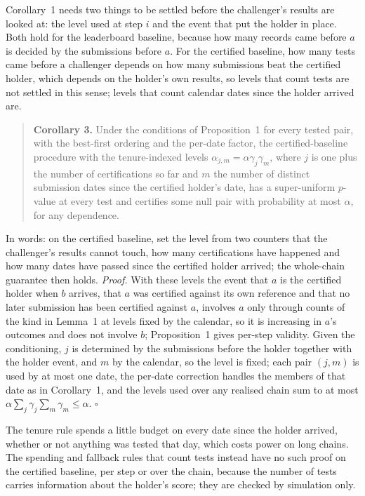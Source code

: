 \documentclass[11pt]{article}
\begin{document}
Corollary~1 needs two things to be settled before the challenger's results are looked at: the level used at step $i$ and the event that put the holder in place.
Both hold for the leaderboard baseline, because how many records came before $a$ is decided by the submissions before $a$.
For the certified baseline, how many tests came before a challenger depends on how many submissions beat the certified holder, which depends on the holder's own results, so levels that count tests are not settled in this sense; levels that count calendar dates since the holder arrived are.

\begin{quote}
\textbf{Corollary 3.}
Under the conditions of Proposition~1 for every tested pair, with the best-first ordering and the per-date factor, the certified-baseline procedure with the tenure-indexed levels $\alpha_{j,m}=\alpha\gamma_j\gamma_m$, where $j$ is one plus the number of certifications so far and $m$ the number of distinct submission dates since the certified holder's date, has a super-uniform $p$-value at every test and certifies some null pair with probability at most $\alpha$, for any dependence.
\end{quote}
In words: on the certified baseline, set the level from two counters that the challenger's results cannot touch, how many certifications have happened and how many dates have passed since the certified holder arrived; the whole-chain guarantee then holds.
\emph{Proof.}
With these levels the event that $a$ is the certified holder when $b$ arrives, that $a$ was certified against its own reference and that no later submission has been certified against $a$, involves $a$ only through counts of the kind in Lemma~1 at levels fixed by the calendar, so it is increasing in $a$'s outcomes and does not involve $b$; Proposition~1 gives per-step validity.
Given the conditioning, $j$ is determined by the submissions before the holder together with the holder event, and $m$ by the calendar, so the level is fixed; each pair $(j,m)$ is used by at most one date, the per-date correction handles the members of that date as in Corollary~1, and the levels used over any realised chain sum to at most $\alpha\sum_j\gamma_j\sum_m\gamma_m\le\alpha$. $\square$

The tenure rule spends a little budget on every date since the holder arrived, whether or not anything was tested that day, which costs power on long chains.
The spending and fallback rules that count tests instead have no such proof on the certified baseline, per step or over the chain, because the number of tests carries information about the holder's score; they are checked by simulation only.
\end{document}
